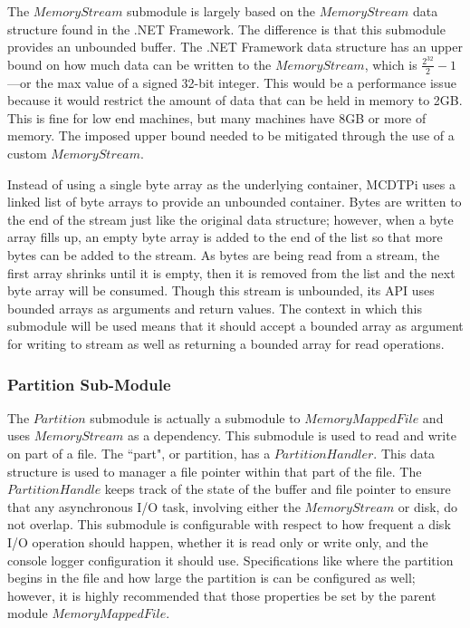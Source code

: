 The $MemoryStream$ submodule is largely based on the $MemoryStream$ data structure found in the .NET Framework. The difference is that this submodule provides an unbounded buffer. The .NET Framework data structure has an upper bound on how much data can be written to the $MemoryStream$, which is $\frac{2^{32}}{2} - 1$---or the max value of a signed 32-bit integer. This would be a performance issue because it would restrict the amount of data that can be held in memory to 2GB. This is fine for low end machines, but many machines have 8GB or more of memory. The imposed upper bound needed to be mitigated through the use of a custom $MemoryStream$.

Instead of using a single byte array as the underlying container, MCDTPi uses a linked list of byte arrays to provide an unbounded container. Bytes are written to the end of the stream just like the original data structure; however, when a byte array fills up, an empty byte array is added to the end of the list so that more bytes can be added to the stream. As bytes are being read from a stream, the first array shrinks until it is empty, then it is removed from the list and the next byte array will be consumed. Though this stream is unbounded, its API uses bounded arrays as arguments and return values. The context in which this submodule will be used means that it should accept a bounded array as argument for writing to stream as well as returning a bounded array for read operations.

\subsubsection{Partition Sub-Module}

The $Partition$ submodule is actually a submodule to $MemoryMappedFile$ and uses $MemoryStream$ as a dependency. This submodule is used to read and write on part of a file. The ``part", or partition, has a $PartitionHandler$. This data structure is used to manager a file pointer within that part of the file. The $PartitionHandle$ keeps track of the state of the buffer and file pointer to ensure that any asynchronous I/O task, involving either the $MemoryStream$ or disk, do not overlap. This submodule is configurable with respect to how frequent a disk I/O operation should happen, whether it is read only or write only, and the console logger configuration it should use. Specifications like where the partition begins in the file and how large the partition is can be configured as well; however, it is highly recommended that those properties be set by the parent module $MemoryMappedFile$.


